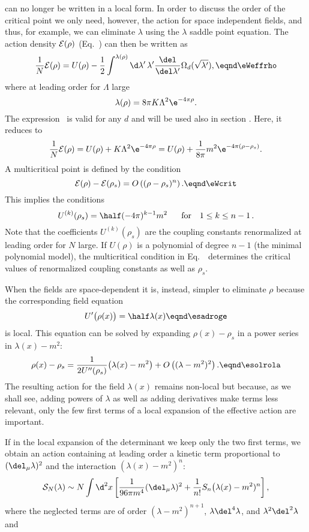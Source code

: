 can no longer be written in a local form. In order to discuss the
order of the critical point we only need, however, the action for
space independent fields, and thus, for example, we can eliminate
$\lambda$ using the $\lambda$ saddle point equation. The action
density   ${\cal E} (\rho)$ (Eq.~\eNEner) can then be written as
$${1\over N}{\cal E} (\rho)=U(\rho)-{1\over2}\int^{\lambda(\rho)}\d \lambda' \,\lambda'
{\del \over \del \lambda'} \Omega_d(\sqrt{\lambda'}),\eqnd\eWeffrho$$
where at leading order for $\Lambda$ large
$$\lambda(\rho)=8\pi K \Lambda^2\e^{-4\pi\rho}. $$
The expression  \eWeffrho\ is
valid  for any $d$ and will be used  also in section \sdouble.
Here, it reduces to
$${1\over N}{\cal E}(\rho)=U(\rho)+K\Lambda^2\e^{-4\pi\rho}=U(\rho)+\frac{1}{8\pi}m^2
\e^{-4\pi(\rho-\rho_s)}.$$
A multicritical point is defined by the condition
$$ {\cal E}(\rho)- {\cal E}(\rho_s) =O\left((\rho-\rho_s)^n\right).\eqnd\eWcrit $$
This implies the conditions
$$U^{(k)}(\rho_s)=\half (-4\pi)^{k-1}
m^2\quad \ \ {\rm for}\ \ \ 1\le k\le n-1\,.$$ Note that the
coefficients $U^{(k)}(\rho_s)$ are the coupling constants
renormalized at leading order for $N$ large. If $U(\rho)$ is a
polynomial of degree $n-1$ (the minimal polynomial model), the
multicritical condition in Eq.~\eWcrit\ determines the critical
values of renormalized coupling constants as well as $\rho_s$.
\par
When the fields are space-dependent it is, instead,
 simpler to eliminate $\rho$
because the corresponding field equation
$$U'\bigl(\rho(x)\bigr)=\half \lambda(x)  \eqnd\esadroge $$
is local. This equation can be solved by expanding $\rho(x)-\rho_s$ in a power
series in $\lambda(x)-m^2$:
$$\rho(x)-\rho_s= {1\over2 U''(\rho_s)}\bigl(\lambda(x)-m^2\bigr)
+O\left((\lambda-m^2)^2\right) . \eqnd\esolrola $$
The resulting action for
the field $\lambda(x)$ remains non-local but because, as we
shall see,  adding powers of $\lambda$
as well as adding derivatives make
terms less relevant, only the few first terms of a local expansion of the effective action are important. \par
If in the local expansion of the determinant we keep only the two
first terms, we obtain an action containing at leading order a kinetic
term proportional to $(\del_\mu\lambda)^2$ and the interaction
$(\lambda(x)-m^2)^n$:
$${\cal S}_N(\lambda) \sim N\int\d^2 x\left[{1\over96\pi
m^4}(\del_\mu\lambda)^2 + \frac{1}{n!}S_n \bigl(\lambda(x)-m^2)^n\right],$$
where the neglected terms are of order $(\lambda-m^2)^{n+1}$, $\lambda\del^4
\lambda$, and $\lambda^2\del^2\lambda$ and
